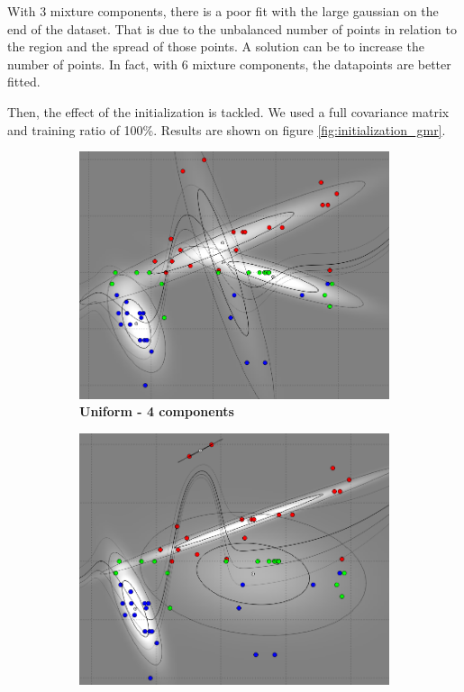 With 3 mixture components, there is a poor fit with the large gaussian on the end of the dataset. That is due to the unbalanced number of points in relation to the region and the spread of those points. A solution can be to increase the number of points. In fact, with 6 mixture components, the datapoints are better fitted.

Then, the effect of the initialization is tackled. We used a full covariance matrix and training ratio of 100\%. Results are shown on figure \ref{fig:initialization_gmr}.


\begin{figure}[!ht]
\centering
\begin{subfigure}[h]{0.3\textwidth}
\centering
\includegraphics[height=0.08\textheight]{./regression/full_cov_uniform_4_mixture_100train.png}
\caption{\bf Uniform - 4 components}
\end{subfigure}
\begin{subfigure}[h]{0.3\textwidth}
\centering
\includegraphics[height=0.08\textheight]{./regression/full_cov_random_4_mixture_100train.png}

\end{subfigure}
\end{figure}
